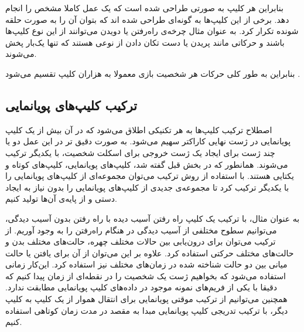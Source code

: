 بنابراین هر کلیپ به صورتی طراحی شده است که یک عمل کاملا مشخص را انجام دهد. برخی از این کلیپ‌ها به گونه‌ای طراحی شده اند که بتوان آن را به صورت حلقه شونده تکرار کرد.
به عنوان مثال چرخه‌ی راه‌رفتن یا دویدن می‌توانند از این نوع کلیپ‌ها باشند
و حرکاتی مانند پریدن یا دست تکان دادن از نوعی هستند که تنها یک‌بار پخش می‌شوند.

بنابراین به طور کلی حرکات هر شخصیت بازی معمولا به هزاران کلیپ تقسیم می‌شود \cite{GameEngineArchitecture}.

\subsection{ترکیب کلیپ‌های پویانمایی}

اصطلاح ترکیب کلیپ‌ها به هر تکنیکی اطلاق می‌شود که در آن بیش از یک کلیپ پویانمایی در ژست نهایی کاراکتر سهیم می‌شود.
به صورت دقیق تر در این عمل دو یا چند ژست برای ایجاد یک ژست خروجی برای اسکلت شخصیت، با یکدیگر ترکیب می‌شوند.
همانطور که در بخش قبل گفته شد، کلیپ‌های پویانمایی، کلیپ‌های کوتاه و یکتایی هستند. با استفاده از روش ترکیب ‌می‌توان مجموعه‌ای از کلیپ‌های پویانمایی را با یکدیگر ترکیب کرد تا مجموعه‌ی جدیدی از کلیپ‌های پویانمایی را بدون نیاز به ایجاد دستی و از پایه‌ی آن‌ها تولید کنیم.

به عنوان مثال، با ترکیب یک کلیپ راه رفتن آسیب دیده با راه رفتن بدون آسیب دیدگی، می‌توانیم سطوح مختلفی از آسیب دیدگی در هنگام راه‌رفتن را به وجود آوریم.
از ترکیب می‌توان برای درون‌یابی بین حالات مختلف چهره، حالت‌های مختلف بدن و حالت‌های مختلف حرکتی استفاده کرد.
علاوه بر این می‌توان از آن برای یافتن یا حالت میانی بین دو حالت شناخته شده در زمان‌های مختلف نیز استفاده کرد. این‌کار زمانی استفاده می‌شود که بخواهیم ژست یک شخصیت را در نقطه‌ای از زمان پیدا کنیم که دقیقا با یکی از فریم‌های نمونه موجود در داده‌های کلیپ پویانمایی مطابقت ندارد.
همچنین می‌توانیم از ترکیب موقتی پویانمایی برای انتقال هموار از یک کلیپ به کلیپ دیگر، با ترکیب تدریجی کلیپ پویانمایی مبدا به مقصد در مدت زمان کوتاهی استفاده کنیم.
